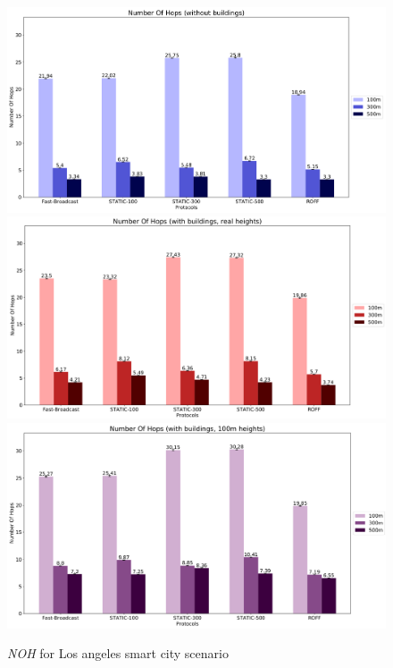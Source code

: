 	\begin{figure}[H]
		\centering
		\includegraphics[width=1.0\textwidth]{immagini/la-smart-city/b0/noh}
		\includegraphics[width=1.0\textwidth]{immagini/la-smart-city/b1/h0/noh}
		\includegraphics[width=1.0\textwidth]{immagini/la-smart-city/b1//h1/noh}
		\caption{\textit{NOH} for Los angeles smart city scenario}
		\label{fig:la-smart-city-noh}
	\end{figure}

